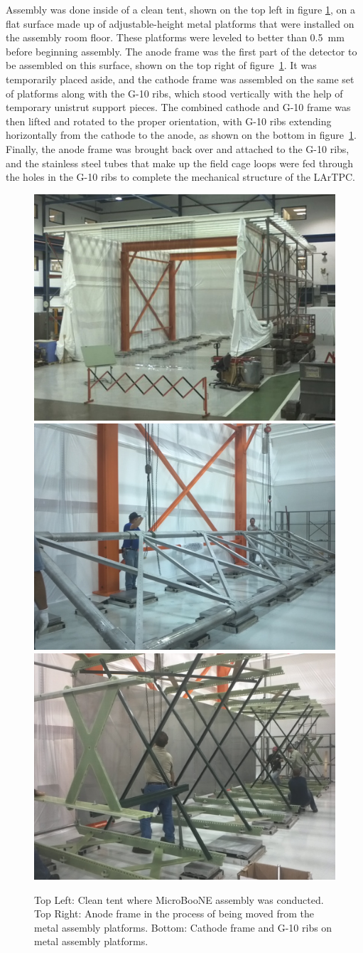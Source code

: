Assembly was done inside of a clean tent, shown on the top left in figure \ref{fig:tent}, on a flat surface made up of adjustable-height metal platforms that were installed on the assembly room floor.  These platforms were leveled to better than 0.5~mm before beginning assembly.  The anode frame was the first part of the detector to be assembled on this surface, shown on the top right of figure~\ref{fig:tent}. It was temporarily placed aside, and the cathode frame was assembled on the same set of platforms along with the G-10 ribs, which stood vertically with the help of temporary unistrut support pieces.  The combined cathode and G-10 frame was then lifted and rotated to the proper orientation, with G-10 ribs extending horizontally from the cathode to the anode, as shown on the bottom in figure~\ref{fig:tent}. Finally, the anode frame was brought back over and attached to the G-10 ribs, and the stainless steel tubes that make up the field cage loops were fed through the holes in the G-10 ribs to complete the mechanical structure of the LArTPC. 

\begin{figure}
\centering	
\includegraphics[width=0.48\linewidth]{figures/tent.jpg}
\includegraphics[width=0.48\linewidth]{figures/tpc-anode-frame.jpg}
\includegraphics[width=0.48\linewidth]{figures/tpc-cathode-g10-frame.jpg}
\caption{Top Left: Clean tent where MicroBooNE \lartpc assembly was conducted. Top Right: Anode frame in the process of being moved from the metal assembly platforms. Bottom: Cathode frame and G-10 ribs on metal assembly platforms.}
\label{fig:tent}
\end{figure}


